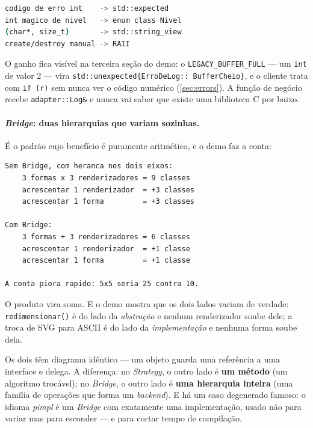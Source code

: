 \begin{lstlisting}[style=bt, language=bash,
    caption={Saída de \texttt{dist/bin/adapter}, seção 1: o que o adaptador
             traduz.}]
codigo de erro int    -> std::expected
int magico de nivel   -> enum class Nivel
(char*, size_t)       -> std::string_view
create/destroy manual -> RAII
\end{lstlisting}

O ganho fica visível na terceira seção do demo: o \texttt{LEGACY\_BUFFER\_FULL}
--- um \texttt{int} de valor 2 --- vira \texttt{std::unexpected\{ErroDeLog::
BufferCheio\}}, e o cliente trata com \texttt{if (r)} sem nunca ver o código
numérico (\cref{sec:errors}). A função de negócio recebe \texttt{adapter::Log\&}
e nunca vai saber que existe uma biblioteca C por baixo.

\paragraph{\emph{Bridge}: duas hierarquias que variam sozinhas.} É o padrão
cujo benefício é puramente aritmético, e o demo faz a conta:

\begin{lstlisting}[style=bt, language=bash,
    caption={Saída de \texttt{dist/bin/bridge}, seção 1: a explosão evitada.}]
Sem Bridge, com heranca nos dois eixos:
    3 formas x 3 renderizadores = 9 classes
    acrescentar 1 renderizador  = +3 classes
    acrescentar 1 forma         = +3 classes

Com Bridge:
    3 formas + 3 renderizadores = 6 classes
    acrescentar 1 renderizador  = +1 classe
    acrescentar 1 forma         = +1 classe

A conta piora rapido: 5x5 seria 25 contra 10.
\end{lstlisting}

O produto vira soma. E o demo mostra que os dois lados variam de verdade:
\texttt{redimensionar()} é do lado da \emph{abstração} e nenhum renderizador
soube dele; a troca de SVG para ASCII é do lado da \emph{implementação} e
nenhuma forma soube dela.

\begin{regra}
Os dois têm diagrama idêntico --- um objeto guarda uma referência a uma
interface e delega. A diferença: no \emph{Strategy}, o outro lado é
\textbf{um método} (um algoritmo trocável); no \emph{Bridge}, o outro lado é
\textbf{uma hierarquia inteira} (uma família de operações que forma um
\emph{backend}). E há um caso degenerado famoso: o idioma \emph{pimpl}
é um \emph{Bridge} com exatamente uma implementação, usado
não para variar mas para esconder --- e para cortar tempo de compilação.
\end{regra}

